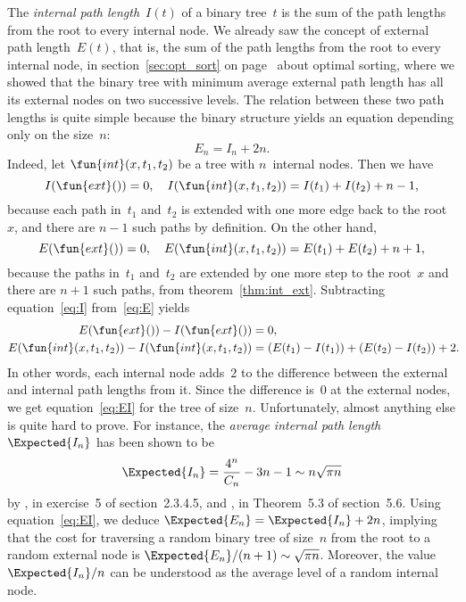 The \emph{internal path length}~\(I(t)\) of a binary tree~\(t\) is the sum of the path lengths
from the root to every internal node. We already saw the concept of
external path length~\(E(t)\),
that is, the sum of the path lengths from the root to every internal
node, in section~\ref{sec:opt_sort} on page~\pageref{sec:opt_sort}
about optimal sorting, where we showed that the binary tree with
minimum average external path length has all its external nodes on two
successive levels. The relation between these two path lengths is
quite simple because the binary structure yields an equation depending
only on the size~\(n\):
\begin{equation}
E_n = I_n + 2n.\label{eq:EI}
\end{equation}
Indeed, let \(\fun{int}(x,t_1,t_2)\) be a tree with \(n\)~internal
nodes. Then we have
\begin{equation}
  I(\fun{ext}()) = 0,\quad
  I(\fun{int}(x,t_1,t_2)) = I(t_1) + I(t_2) + n - 1,
\label{eq:I}
\end{equation}
because each path in~\(t_1\) and~\(t_2\) is extended with one more
edge back to the root~\(x\), and there are \(n-1\) such paths by
definition. On the other hand,
\begin{equation}
  E(\fun{ext}()) = 0,\quad
  E(\fun{int}(x,t_1,t_2)) = E(t_1) + E(t_2) + n + 1,
\label{eq:E}
\end{equation}
because the paths in~\(t_1\) and~\(t_2\) are extended by one more step
to the root~\(x\) and there are \(n+1\) such paths, from
theorem~\vref{thm:int_ext}. Subtracting equation~\eqref{eq:I}
from~\eqref{eq:E} yields
\begin{align*}
  E(\fun{ext}()) - I(\fun{ext}()) &= 0,\\
  E(\fun{int}(x,t_1,t_2)) - I(\fun{int}(x,t_1,t_2))
  &= (E(t_1) - I(t_1)) + (E(t_2) - I(t_2)) + 2.\!\!
\end{align*}
In other words, each internal node adds~\(2\) to the difference
between the external and internal path lengths from it. Since the
difference is~\(0\) at the external nodes, we get
equation~\eqref{eq:EI} for the tree of size~\(n\). Unfortunately,
almost anything else is quite hard to prove. For instance, the
\emph{average internal path length}~\(\Expected{I_n}\) has been shown to be
\begin{equation*}
\Expected{I_n}  = \frac{4^n}{C_n} - 3n - 1 \sim n \sqrt{\pi n}
\end{equation*}
by \cite{Knuth_1997}, in exercise~5 of section~2.3.4.5,
and \cite{SedgewickFlajolet_1996}, in Theorem~5.3 of section~5.6.
Using equation~\eqref{eq:EI}, we deduce \(\Expected{E_n} =
\Expected{I_n} + 2n\), implying that the cost for traversing a random
binary tree of size~\(n\) from the root to a random external node is
\(\Expected{E_n}/(n+1) \sim \sqrt{\pi n}\). Moreover, the value
\(\Expected{I_n}/n\) can be understood as the average level of a
random internal node.

